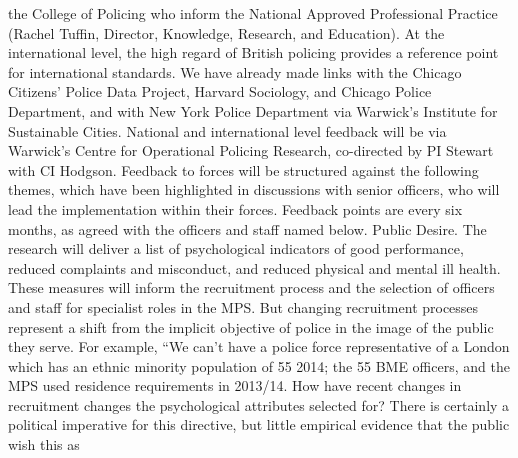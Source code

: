 the College of Policing who inform the National Approved Professional Practice (Rachel
Tuffin, Director, Knowledge, Research, and Education). At the international level, the high
regard of British policing provides a reference point for international standards. We have
already made links with the Chicago Citizens’ Police Data Project, Harvard Sociology, and
Chicago Police Department, and with New York Police Department via Warwick’s Institute for
Sustainable Cities. National and international level feedback will be via Warwick’s Centre for
Operational Policing Research, co-directed by PI Stewart with CI Hodgson.
Feedback to forces will be structured against the following themes, which have been
highlighted in discussions with senior officers, who will lead the implementation within their
forces. Feedback points are every six months, as agreed with the officers and staff named
below.
Public Desire. The research will deliver a list of psychological indicators of good
performance, reduced complaints and misconduct, and reduced physical and mental ill
health. These measures will inform the recruitment process and the selection of officers and
staff for specialist roles in the MPS. But changing recruitment processes represent a shift
from the implicit objective of police in the image of the public they serve. For example, “We
can’t have a police force representative of a London which has an ethnic minority population
of 55%
2014; the 55%
BME officers, and the MPS used residence requirements in 2013/14. How have recent
changes in recruitment changes the psychological attributes selected for? There is certainly
a political imperative for this directive, but little empirical evidence that the public wish this as

